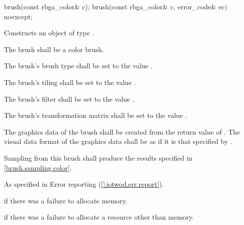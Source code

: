 \begin{itemdecl}
brush(const rbga_color& c);
brush(const rbga_color& c, error_code& ec) noexcept;
\end{itemdecl}
\begin{itemdescr}
\pnum
\effects
Constructs an object of type .

\pnum
The brush shall be a color brush.

\pnum
The brush's brush type shall be set to the value .

\pnum
The brush's tiling shall be set to the value .

\pnum
The brush's filter shall be set to the value .

\pnum
The brush's transformation matrix shall be set to the value .

\pnum
The graphics data of the brush shall be created from the return value of . The visual data format of the graphics data shall be as if it is that specified by .

\pnum
\remarks
Sampling from this brush shall produce the results specified in \ref{brush.sampling.color}.

\pnum
\throws
As specified in Error reporting (\ref{\iotwod.err.report}).

\pnum
\errors
{} if there was a failure to allocate memory.

 if there was a failure to allocate a resource other than memory.
\end{itemdescr}

